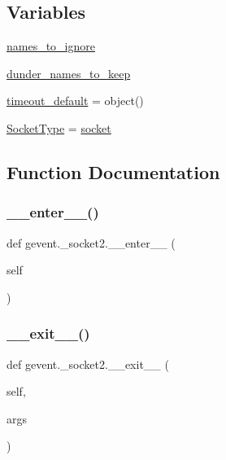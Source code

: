 \subsection*{Variables}
\begin{DoxyCompactItemize}
\item 
\hyperlink{namespacegevent_1_1__socket2_a304fd92f656af75d2d1ca6f4945b2210}{names\+\_\+to\+\_\+ignore}
\item 
\hyperlink{namespacegevent_1_1__socket2_aa4a3d04bd2f71dae3ab325756842389e}{dunder\+\_\+names\+\_\+to\+\_\+keep}
\item 
\hyperlink{namespacegevent_1_1__socket2_afa0ef3532351c57e5e3b3bbe7af89454}{timeout\+\_\+default} = object()
\item 
\hyperlink{namespacegevent_1_1__socket2_a7a9c1b156d1bc2cb789108a3efac8c8c}{Socket\+Type} = \hyperlink{classgevent_1_1__socket2_1_1socket}{socket}
\end{DoxyCompactItemize}


\subsection{Function Documentation}
\mbox{\label{namespacegevent_1_1__socket2_a151c509c4c19fad9a52d44312bfda6d4}} 
\subsubsection{\texorpdfstring{\+\_\+\+\_\+enter\+\_\+\+\_\+()}{\_\_enter\_\_()}}
{\footnotesize\ttfamily def gevent.\+\_\+socket2.\+\_\+\+\_\+enter\+\_\+\+\_\+ (\begin{DoxyParamCaption}\item[{}]{self }\end{DoxyParamCaption})}

\mbox{\label{namespacegevent_1_1__socket2_a24e78c834272e9de4108c2d7a69033ea}} 
\subsubsection{\texorpdfstring{\+\_\+\+\_\+exit\+\_\+\+\_\+()}{\_\_exit\_\_()}}
{\footnotesize\ttfamily def gevent.\+\_\+socket2.\+\_\+\+\_\+exit\+\_\+\+\_\+ (\begin{DoxyParamCaption}\item[{}]{self,  }\item[{}]{args }\end{DoxyParamCaption})}

